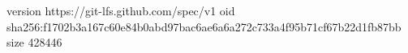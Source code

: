 version https://git-lfs.github.com/spec/v1
oid sha256:f1702b3a167c60e84b0abd97bac6ae6a6a272c733a4f95b71cf67b22d1fb87bb
size 428446
